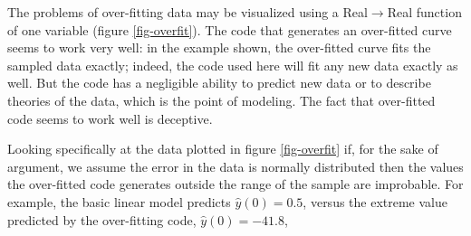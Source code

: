 The problems of over-fitting data may be visualized using a Real$\rightarrow$Real function of one variable (figure \ref{fig-overfit}). The code that generates an over-fitted curve seems to work very well: in the example shown, the over-fitted curve fits the sampled data exactly; indeed, the code used here will fit any new data exactly as well. But the code has a negligible ability to predict new data or to describe theories of the data, which is the point of modeling. The fact that over-fitted code seems to work well is deceptive.

Looking specifically at the data plotted in figure \ref{fig-overfit} if, for the sake of argument, we assume the error in the data is normally distributed then the values the over-fitted code generates outside the range of the sample are improbable. For example, the basic linear model predicts
$\hat{y}(0)=0.5$, 
versus the extreme value predicted by the over-fitting code, 
$\hat{y}(0)=-41.8$, 